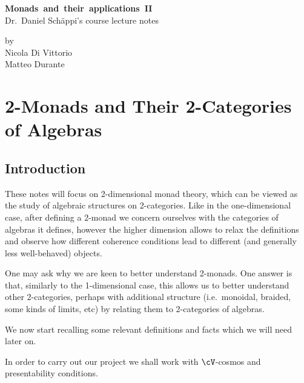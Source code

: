 \documentclass[a4paper,11pt,oneside,openany]{scrbook}
\begin{document}
\begin{titlepage}
	\begin{center}
		\Huge \textbf{Monads~and~their~applications~II}\\
		\vspace{1cm}
		\Large Dr.\ Daniel Schäppi's course lecture notes\\
	\end{center}

	\vspace{1cm}

	\begin{center}
		\Large	by\\
		\vspace{.2cm}
		\Large	Nicola Di Vittorio\\
		\Large	Matteo Durante\\
	\end{center}
\end{titlepage}
\thispagestyle{empty}\doclicenseThis

\frontmatter


\mainmatter

\chapter*{2-Monads and Their 2-Categories of Algebras}

\section{Introduction}

These notes will focus on 2-dimensional monad theory, which can be viewed as the
study of algebraic structures on 2-categories. Like in the one-dimensional case,
after defining a 2-monad we concern ourselves with the categories of algebras it
defines, however the higher dimension allows to relax the definitions and
observe how different coherence conditions lead to different (and generally less
well-behaved) objects.

One may ask why we are keen to better understand 2-monads. One answer is
that, similarly to the 1-dimensional case, this allows us to better understand
other 2-categories, perhaps with additional structure (i.e.\ monoidal, braided,
some kinds of limits, etc) by relating them to 2-categories of algebras.

We now start recalling some relevant definitions and facts which we will need
later on.

In order to carry out our project we shall work with $\cV$-cosmos and
presentability conditions.
\end{document}
